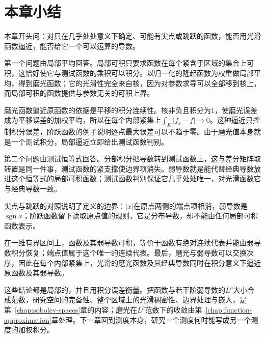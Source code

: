 \section{本章小结}
\label{sec:weakd-summary}

本章开头问：对只在几乎处处意义下确定、可能有尖点或跳跃的函数，能否用光滑函数逼近，能否给它一个可以运算的导数。

第一个问题由局部平均回答。局部可积只要求函数在每个紧含于区域的集合上可积，这恰好使它与测试函数的乘积可以积分。以归一化的隆起函数为权重做局部平均，得到磨光函数；它的光滑性完全来自核，因为对参数求导可以全部移到核上，而局部可积的函数提供与参数无关的可积上界。

磨光函数逼近原函数的依据是平移的积分连续性。核非负且积分为$1$，使磨光误差成为平移误差的加权平均，所以在每个内部紧集上$\int_K\lvert f_\varepsilon-f\rvert\to0$。这种逼近只控制积分误差，阶跃函数的例子说明逐点最大误差可以不趋于零。由于磨光值本身就是一个测试积分，局部逼近立即给出测试函数判别。

第二个问题由测试恒等式回答。分部积分把导数转到测试函数上，这与差分矩阵取转置是同一件事，测试函数的紧支撑使边界项消失。弱导数就是能代替经典导数放进这个恒等式的局部可积函数；测试函数判别保证它几乎处处唯一，对光滑函数它与经典导数一致。

尖点与跳跃的对照说明了定义的边界：$\lvert x\rvert$在原点两侧的端点项相消，弱导数是$\operatorname{sgn}x$；阶跃函数留下读取原点值的规则，它是分布导数，却不能由任何局部可积函数表示。

在一维有界区间上，函数及其弱导数可积，等价于函数有绝对连续代表并能由弱导数积分恢复；端点值属于这个唯一的连续代表。最后，磨光与弱导数可以交换次序，因此在每个内部紧集上，光滑的磨光函数及其经典导数同时在积分意义下逼近原函数及其弱导数。

这些结论都是局部的，并且用积分误差衡量。把函数与若干阶弱导数的$L^p$大小合成范数，研究空间的完备性、整个区域上的光滑稠密性、边界处理与嵌入，是第~\ref{chap:sobolev-spaces}章的内容；磨光在$L^p$范数下的收敛由第~\ref{chap:function-approximation}章处理。下一章回到测度本身，研究一个测度何时能写成另一个测度的加权积分。
